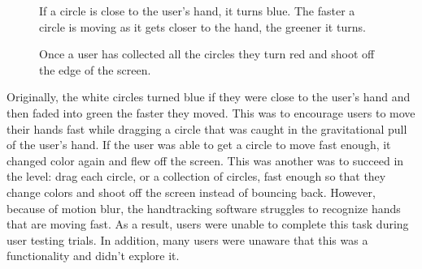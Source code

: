 \documentclass[10pt,twocolumn]{article}
\begin{document}
\begin{figure}[hbh]
\begin{center}
\vspace{.5cm}
\caption{If a circle is close to the user's hand, it turns blue. The faster a circle is moving as it gets closer to the hand, the greener it turns.}
\label{fig:green_circles}
\end{center}
\end{figure} 

\begin{figure}[hbh]
\begin{center}
\vspace{.5cm}
\caption{Once a user has collected all the circles they turn red and shoot off the edge of the screen.}
\label{fig:red_circles}
\end{center}
\end{figure} 

Originally, the white circles turned blue if they were close to the user's hand and then faded into green the faster they moved.  This was to encourage users to move their hands fast while dragging a circle that was caught in the gravitational pull of the user's hand. If the user was able to get a circle to move fast enough, it changed color again and flew off the screen.  This was another was to succeed in the level: drag each circle, or a collection of circles, fast enough so that they change colors and shoot off the screen instead of bouncing back.  However, because of motion blur, the handtracking software struggles to recognize hands that are moving fast.  As a result, users were unable to complete this task during user testing trials. In addition, many users were unaware that this was a functionality and didn't explore it.  
\end{document}
